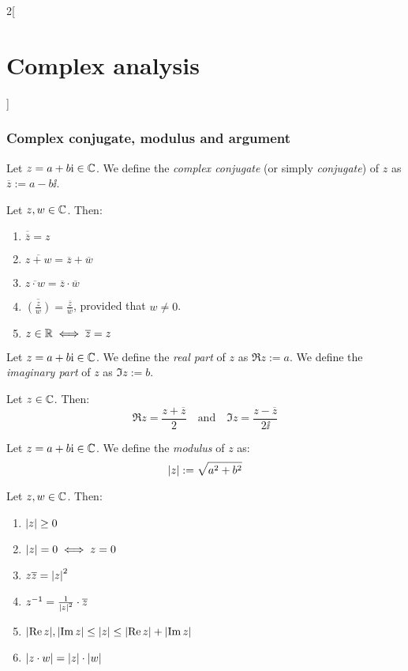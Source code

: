 \documentclass[../../../main_math.tex]{subfiles}
\begin{document}
\begin{multicols}{2}[\section{Complex analysis}]
  \subsubsection{Complex conjugate, modulus and argument}
  \begin{definition}
    Let $z=a+b\mathrm{i}\in\mathbb{C}$. We define the \emph{complex conjugate} (or simply \emph{conjugate}) of $z$ as $\overline{z}:=a-b\ii$.
  \end{definition}
  \begin{proposition}
    Let $z,w\in\mathbb{C}$. Then:
    \begin{enumerate}
      \item $\overline{\overline{z}}=z$
      \item $\overline{z+w}=\overline{z}+\overline{w}$
      \item $\overline{z\cdot w}=\overline{z}\cdot\overline{w}$
      \item $\displaystyle\overline{\left(\frac{z}{w}\right)}=\frac{\overline{z}}{\overline{w}}$, provided that $w\ne 0$.
      \item $z\in\mathbb{R}\iff \overline{z}=z$
    \end{enumerate}
  \end{proposition}
  \begin{definition}
    Let $z=a+b\mathrm{i}\in\mathbb{C}$. We define the \emph{real part} of $z$ as $\Re z:=a$. We define the \emph{imaginary part} of $z$ as $\Im z:=b$.
  \end{definition}
  \begin{proposition}
    Let $z\in\mathbb{C}$. Then: $$\Re z=\frac{z+\overline{z}}{2}\quad\text{and}\quad\Im z=\frac{z-\overline{z}}{2\ii}$$
  \end{proposition}
  \begin{definition}
    Let $z=a+b\mathrm{i}\in\mathbb{C}$. We define the \emph{modulus} of $z$ as: $$\abs{z}:=\sqrt{a^2+b^2}$$
  \end{definition}
  \begin{proposition}
    Let $z,w\in\mathbb{C}$. Then:
    \begin{enumerate}
      \item $\abs{z}\geq 0$
      \item $\abs{z}=0\iff z=0$
      \item $z\overline{z}={\abs{z}}^2$
      \item $z^{-1}=\frac{1}{{\abs{z}}^2}\cdot\overline{z}$
      \item $\abs{\Re z},\abs{\Im z}\leq \abs{z}\leq\abs{\Re z}+\abs{\Im z}$
      \item $\abs{z\cdot w}=\abs{z}\cdot \abs{w}$

\end{enumerate}
\end{proposition}
\end{multicols}
\end{document}
